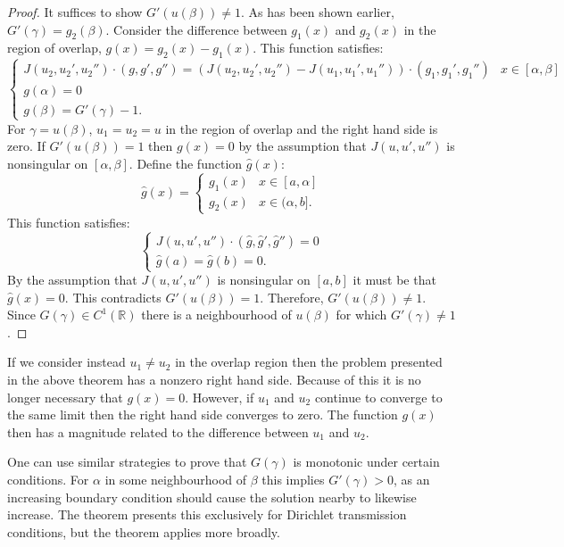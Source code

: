 \documentclass{article}
\begin{document}
\begin{proof}
It suffices to show $G'(u(\beta)) \neq 1$.
As has been shown earlier, $G'(\gamma) = g_2(\beta)$.
Consider the difference between $g_1(x)$ and $g_2(x)$ in the region of overlap, $g(x) = g_2(x) - g_1(x)$.
This function satisfies:
\begin{equation*}
\begin{cases} J(u_2,u_2',u_2'') \cdot (g, g', g'') = \left ( J(u_2, u_2', u_2'') - J(u_1, u_1', u_1'') \right ) \cdot (g_1, g_1', g_1'') & x \in [\alpha, \beta] \\ g(\alpha) = 0 \\ g(\beta) = G'(\gamma) - 1. \end{cases}
\end{equation*}
For $\gamma = u(\beta)$, $u_1 = u_2 = u$ in the region of overlap and the right hand side is zero.
If $G'(u(\beta)) = 1$ then $g(x) = 0$ by the assumption that $J(u,u',u'')$ is nonsingular on $[\alpha,\beta]$.
Define the function $\hat{g}(x)$:
\begin{equation*}
\hat{g}(x) = \begin{cases} g_1(x) & x \in [a,\alpha] \\ g_2(x) & x \in (\alpha,b]. \end{cases}
\end{equation*}
This function satisfies:
\begin{equation*}
\begin{cases} J(u,u',u'') \cdot (\hat{g},\hat{g}',\hat{g}'') = 0 \\ \hat{g}(a) = \hat{g}(b) = 0. \end{cases}
\end{equation*}
By the assumption that $J(u,u',u'')$ is nonsingular on $[a,b]$ it must be that $\hat{g}(x) = 0$.
This contradicts $G'(u(\beta)) = 1$.
Therefore, $G'(u(\beta)) \neq 1$.
Since $G(\gamma) \in C^1(\mathbb{R})$ there is a neighbourhood of $u(\beta)$ for which $G'(\gamma) \neq 1$.
\end{proof}

If we consider instead $u_1 \neq u_2$ in the overlap region then the problem presented in the above theorem has a nonzero right hand side.
Because of this it is no longer necessary that $g(x) = 0$.
However, if $u_1$ and $u_2$ continue to converge to the same limit then the right hand side converges to zero.
The function $g(x)$ then has a magnitude related to the difference between $u_1$ and $u_2$.

One can use similar strategies to prove that $G(\gamma)$ is monotonic under certain conditions.
For $\alpha$ in some neighbourhood of $\beta$ this implies $G'(\gamma)>0$, as an increasing boundary condition should cause the solution nearby to likewise increase.
The theorem presents this exclusively for Dirichlet transmission conditions, but the theorem applies more broadly.
\end{document}
